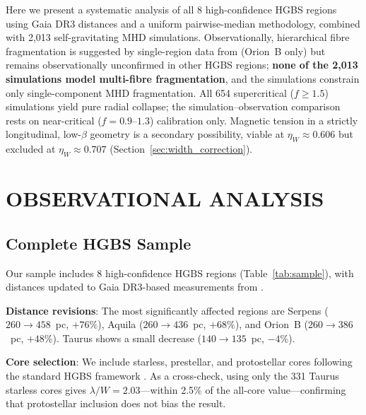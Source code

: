 \documentclass[twoside,twocolumn]{mnras}
\begin{document}
Here we present a systematic analysis of all 8 high-confidence HGBS regions using Gaia DR3 distances and a uniform pairwise-median methodology, combined with 2,013 self-gravitating MHD simulations. Observationally, hierarchical fibre fragmentation is suggested by single-region data from \citealt{Yang2024} (Orion~B only) but remains observationally unconfirmed in other HGBS regions; \textbf{none of the 2,013 simulations model multi-fibre fragmentation}, and the simulations constrain only single-component MHD fragmentation. All 654 supercritical ($f \geq 1.5$) simulations yield pure radial collapse; the simulation--observation comparison rests on near-critical ($f = 0.9$--$1.3$) calibration only. Magnetic tension in a strictly longitudinal, low-$\beta$ geometry is a secondary possibility, viable at $\eta_W \approx 0.606$ but excluded at $\eta_W \approx 0.707$ (Section~\ref{sec:width_correction}).

\section{OBSERVATIONAL ANALYSIS}

\subsection{Complete HGBS Sample}
\label{sec:sample}

Our sample includes 8 high-confidence HGBS regions (Table~\ref{tab:sample}), with
distances updated to Gaia DR3-based measurements from \citet{Zhang2023}.

\textbf{Distance revisions}: The most significantly affected regions are Serpens
($260 \to 458$~pc, $+76\%$), Aquila ($260 \to 436$~pc, $+68\%$), and Orion~B
($260 \to 386$~pc, $+48\%$). Taurus shows a small decrease ($140 \to 135$~pc, $-4\%$).

\textbf{Core selection}: We include starless, prestellar, and protostellar cores following the standard HGBS framework \citep{Konyves2015, Konyves2020}. As a cross-check, using only the 331 Taurus starless cores gives $\lambda/W = 2.03$---within 2.5\% of the all-core value---confirming that protostellar inclusion does not bias the result.
\end{document}
